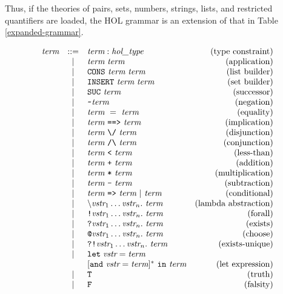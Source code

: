 {Thus, if the theories of pairs, sets, numbers, strings, lists, and
restricted quantifiers are loaded, the HOL grammar is an extension of
that in Table \ref{expanded-grammar}.
\begin{table}
  \[
  \begin{array}{rclr}
    \term & ::= & \term : \type & \mbox{(type constraint)} \\
    & | & \term\ \term & \mbox{(application)} \\
    & | & \CONS\ \term \ \term & \mbox{(list builder)} \\
    & | & \INSERT\ \term \ \term & \mbox{(set builder)} \\
    & | & \SUC\ \term & \mbox{(successor)} \\
    & | & \verb+~+ \term & \mbox{(negation)} \\
    & | & \term\ =\ \term & \mbox{(equality)} \\
    & | & \term\ \IMP\ \term & \mbox{(implication)} \\
    & | & \term\ \verb+\/+\ \term & \mbox{(disjunction)} \\
    & | & \term\ \verb+/\+\ \term & \mbox{(conjunction)} \\
    & | & \term\ \verb+<+ \ \term & \mbox{(less-than)} \\
    & | & \term\ \verb!+! \ \term & \mbox{(addition)} \\
    & | & \term\ \verb!*! \ \term & \mbox{(multiplication)} \\
    & | & \term\ \verb!-! \ \term & \mbox{(subtraction)} \\
    & | & \term\ \verb+=>+\ \term\ |\ \term & \mbox{(conditional)} \\
    & | & \bs\vstr_1\ldots\vstr_n.\ \term & \mbox{(lambda abstraction)} \\
    & | & \ALL \vstr_1\ldots\vstr_n.\ \term & \mbox{(forall)} \\
    & | & \EXISTS \vstr_1\ldots\vstr_n.\ \term & \mbox{(exists)} \\
    & | & \CHOOSE \vstr_1\ldots\vstr_n.\ \term & \mbox{(choose)} \\
    & | & \EXISTSONE \vstr_1\ldots\vstr_n.\ \term &\mbox{(exists-unique)} \\
    & | & \LET\; \vstr = \term  & \\
    &   & [\und\ \vstr = \term]^{*}\ \IN\ \term & \mbox{(let expression)} \\
    & | & \verb+T+ & \mbox{(truth)} \\
    & | & \verb+F+ & \mbox{(falsity)} \\

\end{array}\]
\end{table}}
